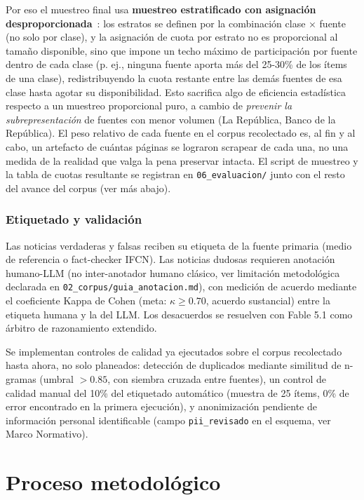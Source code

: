 Por eso el muestreo final usa \textbf{muestreo estratificado con asignación desproporcionada}~\cite{Cochran1977}: los estratos se definen por la combinación clase × fuente (no solo por clase), y la asignación de cuota por estrato no es proporcional al tamaño disponible, sino que impone un techo máximo de participación por fuente dentro de cada clase (p. ej., ninguna fuente aporta más del 25-30\% de los ítems de una clase), redistribuyendo la cuota restante entre las demás fuentes de esa clase hasta agotar su disponibilidad. Esto sacrifica algo de eficiencia estadística respecto a un muestreo proporcional puro, a cambio de \textit{prevenir la subrepresentación} de fuentes con menor volumen (La República, Banco de la República). El peso relativo de cada fuente en el corpus recolectado es, al fin y al cabo, un artefacto de cuántas páginas se lograron scrapear de cada una, no una medida de la realidad que valga la pena preservar intacta. El script de muestreo y la tabla de cuotas resultante se registran en \texttt{06\_evaluacion/} junto con el resto del avance del corpus (ver más abajo).

\subsubsection{Etiquetado y validación}

Las noticias verdaderas y falsas reciben su etiqueta de la fuente primaria (medio de referencia o fact-checker IFCN). Las noticias dudosas requieren anotación humano-LLM (no inter-anotador humano clásico, ver limitación metodológica declarada en \texttt{02\_corpus/guia\_anotacion.md}), con medición de acuerdo mediante el coeficiente Kappa de Cohen (meta: $\kappa \geq 0.70$, acuerdo sustancial) entre la etiqueta humana y la del LLM. Los desacuerdos se resuelven con Fable 5.1 como árbitro de razonamiento extendido.

Se implementan controles de calidad ya ejecutados sobre el corpus recolectado hasta ahora, no solo planeados: detección de duplicados mediante similitud de n-gramas (umbral $> 0.85$, con siembra cruzada entre fuentes), un control de calidad manual del 10\% del etiquetado automático (muestra de 25 ítems, 0\% de error encontrado en la primera ejecución), y anonimización pendiente de información personal identificable (campo \texttt{pii\_revisado} en el esquema, ver Marco Normativo).

\section{Proceso metodológico}


